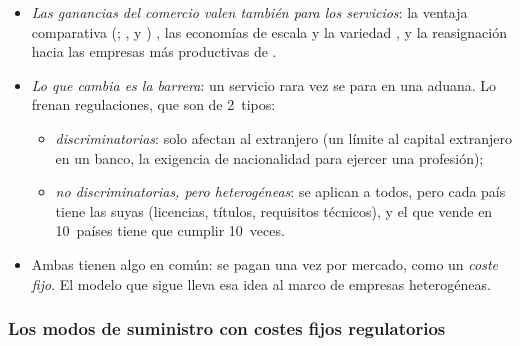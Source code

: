 \documentclass[11pt]{article}
\begin{document}
\begin{itemize}
\item \emph{Las ganancias del comercio valen también para los servicios}: la ventaja comparativa (; ,  y ) , las economías de escala y la variedad , y la reasignación hacia las empresas más productivas de \textcite{Melitz2003Impact}.
\item \emph{Lo que cambia es la barrera}: un servicio rara vez se para en una aduana. Lo frenan regulaciones, que son de 2~tipos:
  \begin{itemize}
  \item \emph{discriminatorias}: solo afectan al extranjero (un límite al capital extranjero en un banco, la exigencia de nacionalidad para ejercer una profesión);
  \item \emph{no discriminatorias, pero heterogéneas}: se aplican a todos, pero cada país tiene las suyas (licencias, títulos, requisitos técnicos), y el que vende en 10~países tiene que cumplir 10~veces.
  \end{itemize}
\item Ambas tienen algo en común: se pagan una vez por mercado, como un \emph{coste fijo}. El modelo que sigue lleva esa idea al marco de empresas heterogéneas.
\end{itemize}

\subsubsection{Los modos de suministro\cortetitulo{} con costes fijos regulatorios}\label{sec:modelo-servicios}
\end{document}
